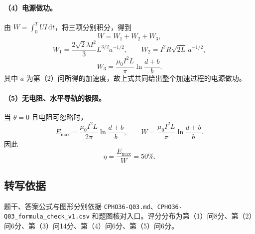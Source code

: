 \paragraph{（4）电源做功。} 由 $W=\int_0^T UI\,\mathrm{d}t$，将三项分别积分，得到
\[
W=W_1+W_2+W_3,
\]
\[
W_1=\frac{2\sqrt2\lambda I^2}{3}L^{3/2}a^{-1/2},\qquad
W_2=I^2R\sqrt{2L}\,a^{-1/2},
\]
\[
\boxed{W_3=\frac{\mu_0 I^2L}{\pi}\ln\frac{d+b}{b}.}
\]
其中 $a$ 为第（2）问所得的加速度，故上式共同给出整个加速过程的电源做功。

\paragraph{（5）无电阻、水平导轨的极限。} 当 $\theta=0$ 且电阻可忽略时，
\[
E_{\max}=\frac{\mu_0 I^2L}{2\pi}\ln\frac{d+b}{b},
\qquad
W=\frac{\mu_0 I^2L}{\pi}\ln\frac{d+b}{b}.
\]
因此
\[
\boxed{\eta=\frac{E_{\max}}{W}=50\%.}
\]

\subsection{转写依据}
题干、答案公式与图形分别依据 \texttt{CPHO36-Q03.md}、\texttt{CPHO36-Q03\_formula\_check\_v1.csv} 和题图核对入口。评分分布为第（1）问8分、第（2）问6分、第（3）问14分、第（4）问6分、第（5）问6分。
